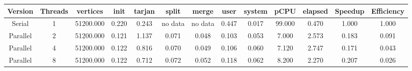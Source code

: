 \begin{tabular}{|c|c|c|c|c|c|c|c|c|c|c|c|c|}
\toprule
 Version &  Threads &  vertices &  init &  tarjan &   split &   merge &  user &  system &   pCPU &  elapsed &  Speedup &  Efficiency \\
\midrule
  Serial &        1 & 51200.000 & 0.220 &   0.243 & no data & no data & 0.447 &   0.017 & 99.000 &    0.470 &    1.000 &       1.000 \\
Parallel &        2 & 51200.000 & 0.121 &   1.137 &   0.071 &   0.048 & 0.103 &   0.053 &  7.000 &    2.573 &    0.183 &       0.091 \\
Parallel &        4 & 51200.000 & 0.122 &   0.816 &   0.070 &   0.049 & 0.106 &   0.060 &  7.120 &    2.747 &    0.171 &       0.043 \\
Parallel &        8 & 51200.000 & 0.122 &   0.712 &   0.072 &   0.052 & 0.118 &   0.062 &  8.200 &    2.270 &    0.207 &       0.026 \\
\bottomrule
\end{tabular}
